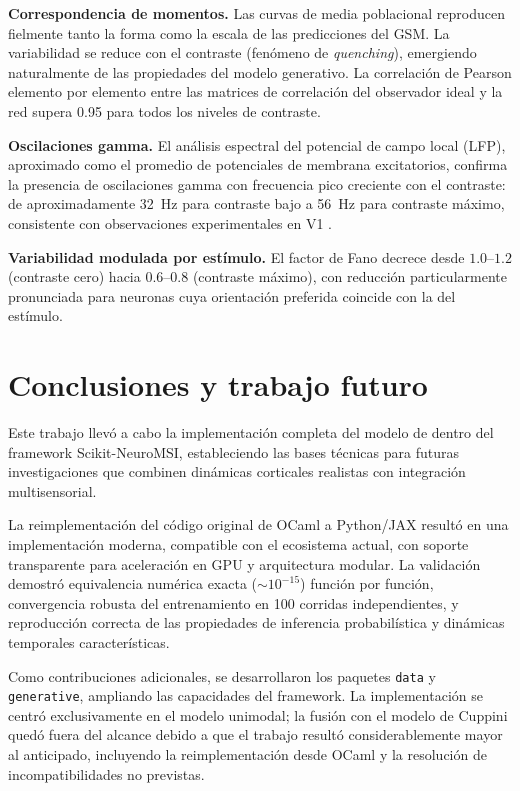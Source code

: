 \documentclass[spanish,a4paper,11pt]{article}
\begin{document}
\textbf{Correspondencia de momentos.} Las curvas de media poblacional reproducen fielmente tanto la forma como la escala de las predicciones del GSM. La variabilidad se reduce con el contraste (fenómeno de \textit{quenching}), emergiendo naturalmente de las propiedades del modelo generativo. La correlación de Pearson elemento por elemento entre las matrices de correlación del observador ideal y la red supera 0.95 para todos los niveles de contraste.

\textbf{Oscilaciones gamma.} El análisis espectral del potencial de campo local (LFP), aproximado como el promedio de potenciales de membrana excitatorios, confirma la presencia de oscilaciones gamma con frecuencia pico creciente con el contraste: de aproximadamente 32~Hz para contraste bajo a 56~Hz para contraste máximo, consistente con observaciones experimentales en V1 \citep{echeveste2020cortical}.

\textbf{Variabilidad modulada por estímulo.} El factor de Fano decrece desde $1.0$--$1.2$ (contraste cero) hacia $0.6$--$0.8$ (contraste máximo), con reducción particularmente pronunciada para neuronas cuya orientación preferida coincide con la del estímulo.


\section{Conclusiones y trabajo futuro}
\label{sec:conclu}

Este trabajo llevó a cabo la implementación completa del modelo de \citet{echeveste2020cortical} dentro del framework Scikit-NeuroMSI, estableciendo las bases técnicas para futuras investigaciones que combinen dinámicas corticales realistas con integración multisensorial.

La reimplementación del código original de OCaml a Python/JAX resultó en una implementación moderna, compatible con el ecosistema actual, con soporte transparente para aceleración en GPU y arquitectura modular. La validación demostró equivalencia numérica exacta ($\sim 10^{-15}$) función por función, convergencia robusta del entrenamiento en 100 corridas independientes, y reproducción correcta de las propiedades de inferencia probabilística y dinámicas temporales características.

Como contribuciones adicionales, se desarrollaron los paquetes \texttt{data} y \texttt{generative}, ampliando las capacidades del framework. La implementación se centró exclusivamente en el modelo unimodal; la fusión con el modelo de Cuppini quedó fuera del alcance debido a que el trabajo resultó considerablemente mayor al anticipado, incluyendo la reimplementación desde OCaml y la resolución de incompatibilidades no previstas.
\end{document}
